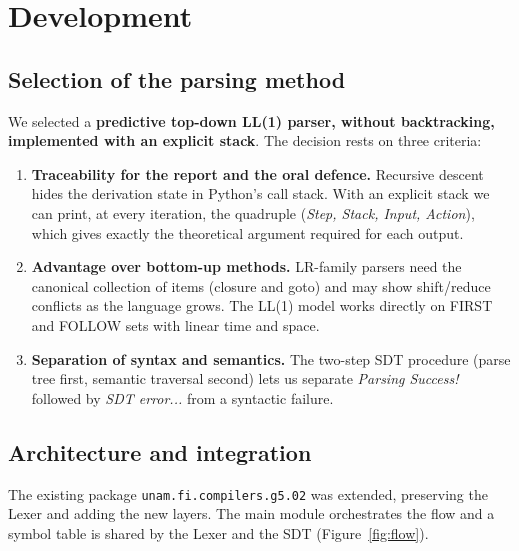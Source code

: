\documentclass[11pt,a4paper]{article}
\begin{document}
\section{Development}
\label{sec:dev}

\subsection{Selection of the parsing method}
We selected a \textbf{predictive top-down LL(1) parser, without backtracking, implemented with an explicit stack}. The decision rests on three criteria:
\begin{enumerate}
  \item \textbf{Traceability for the report and the oral defence.} Recursive descent hides the derivation state in Python's call stack. With an explicit stack we can print, at every iteration, the quadruple (\emph{Step, Stack, Input, Action}), which gives exactly the theoretical argument required for each output.
  \item \textbf{Advantage over bottom-up methods.} LR-family parsers need the canonical collection of items (closure and goto) and may show shift/reduce conflicts as the language grows. The LL(1) model works directly on FIRST and FOLLOW sets with linear time and space.
  \item \textbf{Separation of syntax and semantics.} The two-step SDT procedure (parse tree first, semantic traversal second) lets us separate \emph{Parsing Success!} followed by \emph{SDT error...} from a syntactic failure.
\end{enumerate}

\subsection{Architecture and integration}
The existing package \texttt{unam.fi.compilers.g5.02} was extended, preserving the Lexer and adding the new layers. The main module orchestrates the flow and a symbol table is shared by the Lexer and the SDT (Figure~\ref{fig:flow}).
\end{document}
